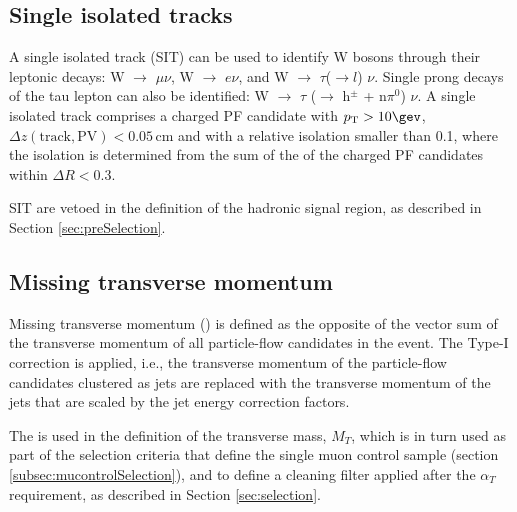 \subsection{Single isolated tracks}
\label{sec:SIT}

A single isolated track (SIT) can be used to identify W bosons through their leptonic decays: 
W $\rightarrow$ $\mu \nu$, W $\rightarrow$ $e\nu$, and W $\rightarrow$ $\tau$($\rightarrow l$) $\nu$. 
Single prong decays of the tau lepton can also be identified: W $\rightarrow$ $\tau$ ($\rightarrow$ h$^{\pm}$ + n$\pi^{0}$) $\nu$. 
A single isolated track comprises a charged PF candidate with $\Pt > 10 \gev$, $\Delta z(\mathrm{track}, \mathrm{PV}) < 0.05 \, \mathrm{cm}$ 
and with a relative isolation smaller than 0.1, where the isolation is determined from the sum 
of the \Pt of the charged PF candidates within $\Delta R < 0.3$.

SIT are vetoed in the definition of the hadronic signal region, 
as described in Section \ref{sec:preSelection}.


\subsection{Missing transverse momentum}
Missing transverse momentum (\met) is defined as the opposite of the vector sum
of the transverse momentum of all particle-flow candidates in the event.
The Type-I \met correction \cite{Khachatryan:2014gga} is applied, i.e., the transverse momentum of
the particle-flow candidates clustered as jets are replaced with the
transverse momentum of the jets that are scaled by the jet energy
correction factors.

The \met is used in the definition of 
the transverse mass, $M_{T}$, which is in turn used as part of
the selection criteria that define the single muon control sample 
(section \ref{subsec:mucontrolSelection}), and to define a cleaning filter applied after the
$\alpha_{T}$ requirement, as described in Section \ref{sec:selection}.



